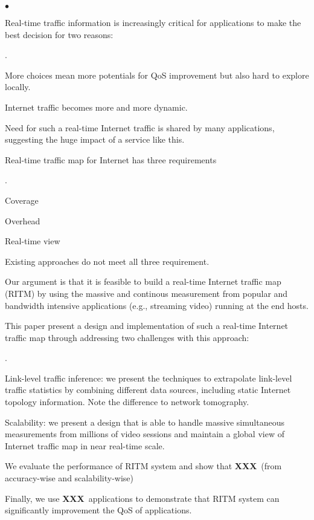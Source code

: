 \documentclass[10pt,twocolumn]{article}
\newcommand{\fillme}{{\bf XXX}~}
\newcounter{packednmbr}
\newenvironment{packedenumerate}{\begin{list}{\thepackednmbr.}{\usecounter{packednmbr}\setlength{\itemsep}{0.5pt}\addtolength{\labelwidth}{-4pt}\setlength{\leftmargin}{\labelwidth}\setlength{\listparindent}{\parindent}\setlength{\parsep}{1pt}\setlength{\topsep}{0pt}}}{\end{list}}
\newenvironment{packeditemize}{\begin{list}{$\bullet$}{\setlength{\itemsep}{0.5pt}\addtolength{\labelwidth}{-4pt}\setlength{\leftmargin}{\labelwidth}\setlength{\listparindent}{\parindent}\setlength{\parsep}{1pt}\setlength{\topsep}{0pt}}}{\end{list}}
\begin{document}
\begin{packeditemize}
	\item Real-time traffic information is increasingly critical for applications to make the best decision for two reasons:
	\begin{packedenumerate}
		\item More choices mean more potentials for QoS improvement but also hard to explore locally.
		\item Internet traffic becomes more and more dynamic.
		\item Need for such a real-time Internet traffic is shared by many applications, suggesting the huge impact of a service like this.
	\end{packedenumerate}
	\item Real-time traffic map for Internet has three requirements
	\begin{packedenumerate}
		\item Coverage
		\item Overhead
		\item Real-time view
	\end{packedenumerate}
	\item Existing approaches do not meet all three requirement. 
	\item Our argument is that it is feasible to build a real-time Internet traffic map (RITM) by using the massive and continous measurement from popular and bandwidth intensive applications (e.g., streaming video) running at the end hosts.
	\item This paper present a design and implementation of such a real-time Internet traffic map through addressing two challenges with this approach:
	\begin{packedenumerate}
		\item Link-level traffic inference: we present the techniques to extrapolate link-level traffic statistics by combining different data sources, including static Internet topology information. Note the difference to network tomography.
		\item Scalability: we present a design that is able to handle massive simultaneous measurements from millions of video sessions and maintain a global view of Internet traffic map in near real-time scale.
	\end{packedenumerate}
	\item We evaluate the performance of RITM system and show that \fillme (from accuracy-wise and scalability-wise)
	\item Finally, we use \fillme applications to demonstrate that RITM system can significantly improvement the QoS of applications.
\end{packeditemize}
\end{document}
